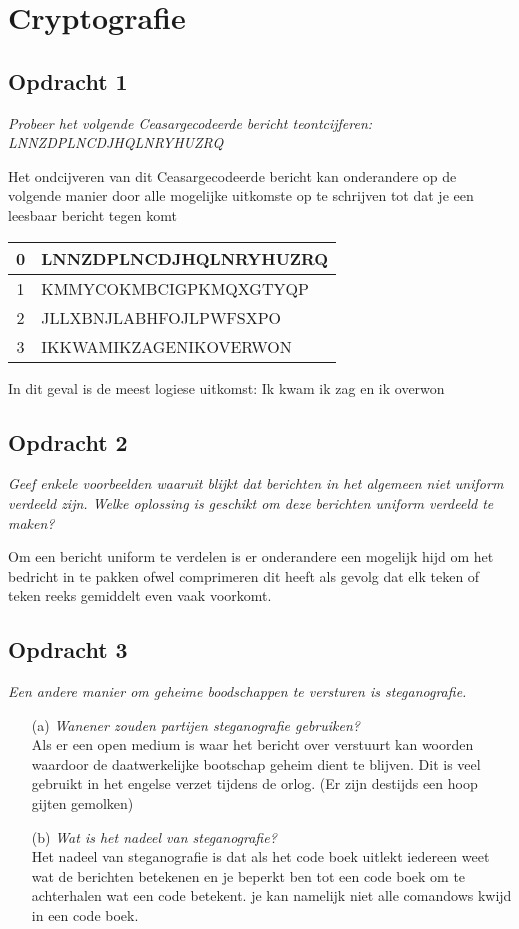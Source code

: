 \chapter{Cryptografie}

\section{Opdracht 1}
\emph{Probeer het volgende Ceasargecodeerde bericht teontcijferen:\\
LNNZDPLNCDJHQLNRYHUZRQ}

Het ondcijveren van dit Ceasargecodeerde bericht kan onderandere op de volgende manier door alle mogelijke uitkomste op te schrijven tot dat je een leesbaar bericht tegen komt

\begin{tabular}{|c|l|}
  \hline
  0 & LNNZDPLNCDJHQLNRYHUZRQ \\\hline
  1 & KMMYCOKMBCIGPKMQXGTYQP \\\hline
  2 & JLLXBNJLABHFOJLPWFSXPO \\\hline
  3 & IKKWAMIKZAGENIKOVERWON \\\hline
\end{tabular}

In dit geval is de meest logiese uitkomst: Ik kwam ik zag en ik overwon

\section{Opdracht 2}
\emph{Geef enkele voorbeelden waaruit blijkt dat berichten in het algemeen niet uniform verdeeld zijn. Welke oplossing is geschikt om deze berichten uniform verdeeld te maken?}

Om een bericht uniform te verdelen is er onderandere een mogelijk hijd om het bedricht in te pakken ofwel comprimeren dit heeft als gevolg dat elk teken of teken reeks gemiddelt even vaak voorkomt.

\section{Opdracht 3}
\emph{Een andere manier om geheime boodschappen te versturen is steganografie.}
\begin{itemize}
\item[(a)] \emph{Wanener zouden partijen steganografie gebruiken?} \\
  Als er een open medium is waar het bericht over verstuurt kan woorden waardoor de daatwerkelijke bootschap geheim dient te blijven. Dit is veel gebruikt in het engelse verzet tijdens de orlog. (Er zijn destijds een hoop gijten gemolken)
\item[(b)] \emph{Wat is het nadeel van steganografie?}\\
  Het nadeel van steganografie is dat als het code boek uitlekt iedereen weet wat de berichten betekenen en je beperkt ben tot een code boek om te achterhalen wat een code betekent. je kan namelijk niet alle comandows kwijd in een code boek.
\end{itemize}

